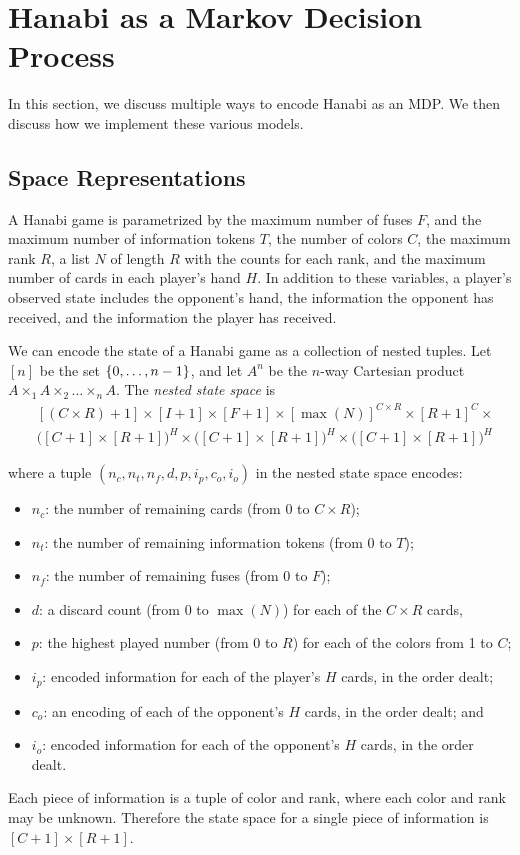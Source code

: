 \section{Hanabi as a Markov Decision Process}\label{sec:hanabimdp}

In this section, we discuss multiple ways to encode Hanabi as an MDP. We then
discuss how we implement these various models.

\subsection{Space Representations}
A Hanabi game is parametrized by the maximum number of fuses $F$, and the
maximum number of information tokens $T$, the number of colors $C$, the maximum
rank $R$, a list $N$ of length $R$ with the counts for each rank, and the
maximum number of cards in each player's hand $H$.
In addition to these variables, a player's observed state includes the
opponent's hand, the information the opponent has received, and the information
the player has received.

We can encode the state of a Hanabi game as a collection of nested tuples. Let
$[n]$ be the set $\left\{0, \ldots, n-1\right\}$, and let $A^n$ be the $n$-way Cartesian
product $A \times_1 A \times_2 \ldots \times_n A$. The \emph{nested state
space} is
\begin{align*}
    &[(C \times R) + 1] \times
  [I + 1] \times
  [F + 1] \times
  {[\max(N)]}^{C \times R}
  \times
  {[R + 1]}^{C} \times \\
    &{\bigl([C + 1] \times [R + 1]\bigr)}^{H}
  \times {\bigl([C + 1] \times [R + 1]\bigr)}^{H}
  \times {\bigl([C + 1] \times [R + 1]\bigr)}^{H}
\end{align*}

where a tuple $(n_c, n_t, n_f, d, p, i_p, c_o, i_o)$ in the nested state space
encodes:
\begin{itemize}
  \setlength\itemsep{0em}
  \item $n_c$: the number of remaining cards (from 0 to $C \times R$);
  \item $n_t$: the number of remaining information tokens (from 0 to $T$);
  \item $n_f$: the number of remaining fuses (from 0 to $F$);
  \item $d$: a discard count (from 0 to $\max(N)$) for each of the $C \times R$
      cards,
  \item $p$: the highest played number (from 0 to $R$) for each of the colors
      from 1 to $C$;
  \item $i_p$: encoded information for each of the player's $H$ cards, in the
      order dealt;
  \item $c_o$: an encoding of each of the opponent's $H$ cards, in the order
      dealt; and
  \item $i_o$: encoded information for each of the opponent's $H$ cards, in the
      order dealt.
\end{itemize}
Each piece of information is a tuple of color and rank, where each color and
rank may be unknown. Therefore the state space for a single piece of
information is $[C + 1] \times [R + 1]$.

